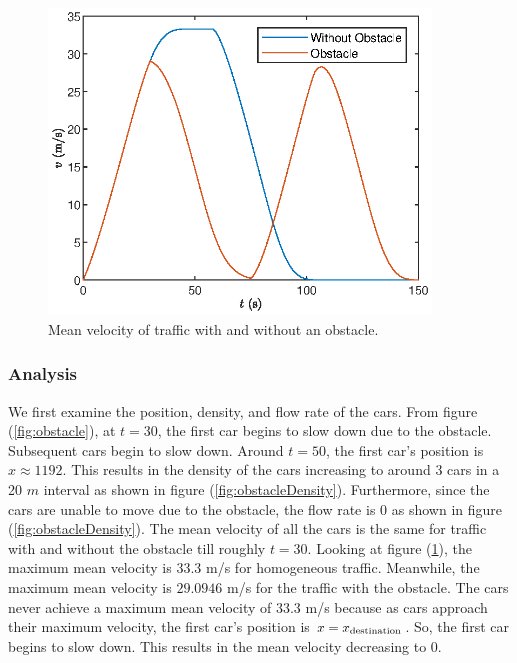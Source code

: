 \documentclass[12pt]{article}
\begin{document}
    \begin{figure}[H]
      \includegraphics[width=4in]{BottleNeck7.eps}
      \centering
      \caption{Mean velocity of traffic with and without an obstacle.}
      \label{fig:obstacleMean}
      \end{figure}

    \subsubsection{Analysis}
    We first examine the position, density, and flow rate of the cars. From figure (\ref{fig:obstacle}), at $t=30$, the first car begins to slow down due to the obstacle. Subsequent cars begin to slow down. Around $t=50$, the first car's position is $x\approx 1192$. This results in the density of the cars increasing to around $3$ cars in a 20 $m$ interval as shown in figure (\ref{fig:obstacleDensity}). Furthermore, since the cars are unable to move due to the obstacle, the flow rate is $0$ as shown in figure (\ref{fig:obstacleDensity}). The mean velocity of all the cars is the same for traffic with and without the obstacle till roughly $t=30$. Looking at figure (\ref{fig:obstacleMean}), the maximum mean velocity is $33.3$ m/s for homogeneous traffic. Meanwhile, the maximum mean velocity is $29.0946$ m/s for the traffic with the obstacle. The cars never achieve a maximum mean velocity of $33.3$ m/s because as cars approach their maximum velocity, the first car's position is $x = x_{\rm destination}$. So, the first car begins to slow down. This results in the mean velocity  decreasing to $0$. 
\end{document}
